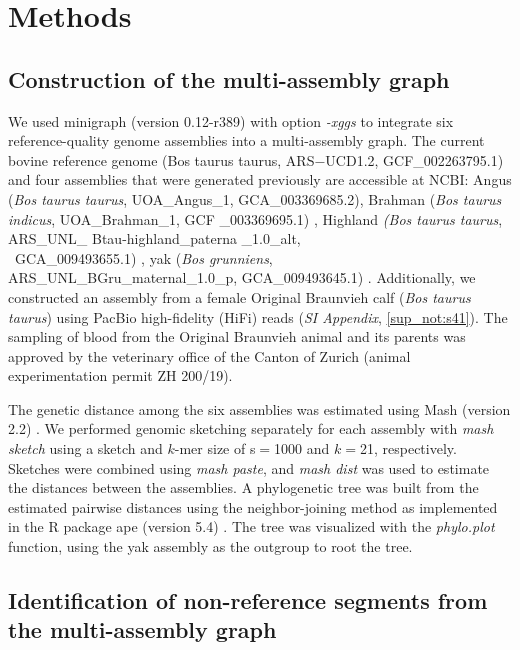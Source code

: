 \documentclass[../main.tex]{subfiles}
\begin{document}
\section{Methods}
\vspace{-1em}
\subsection*{Construction of the multi-assembly graph}

We used minigraph \citep{li2020design} (version 0.12-r389) with option \emph{-xggs} to integrate six reference-quality genome assemblies into a multi-assembly graph. The current bovine reference genome (Bos taurus taurus, ARS$-$UCD1.2, GCF\_002263795.1) and four assemblies that were generated previously are accessible at NCBI: Angus (\emph{Bos taurus taurus}, UOA\_Angus\_1, GCA\_003369685.2)\citep{low2020haplotype}, Brahman (\emph{Bos taurus indicus}, UOA\_Brahman\_1, GCF \_003369695.1) \citep{low2020haplotype}, Highland \emph{(Bos taurus taurus}, ARS\_UNL\_ Btau-highland\_paterna \_1.0\_alt, \\ GCA\_009493655.1) \citep{rice2020continuous}, yak (\emph{Bos grunniens}, \\ ARS\_UNL\_BGru\_maternal\_1.0\_p, GCA\_009493645.1) \citep{rice2020continuous}. Additionally, we constructed an assembly from a female Original Braunvieh calf (\emph{Bos taurus taurus}) using PacBio high-fidelity (HiFi) reads (\emph{SI Appendix}, \ref{sup_not:s41}). The sampling of blood from the Original Braunvieh animal and its parents was approved by the veterinary office of the Canton of Zurich (animal experimentation permit ZH 200/19).

The genetic distance among the six assemblies was estimated using Mash (version 2.2) \citep{ondov2016mash}. We performed genomic sketching separately for each assembly with \emph{mash sketch } using a sketch and $k$-mer size of s$=$1000 and $k$$=$21, respectively. Sketches were combined using \emph{ mash paste}, and \emph{mash dist} was used to estimate the distances between the assemblies. A phylogenetic tree was built from the estimated pairwise distances using the neighbor-joining method \citep{saitou1987neighbor} as implemented in the R package ape (version 5.4) \citep{paradis2019ape}. The tree was visualized with the \emph{phylo.plot} function, using the yak assembly as the outgroup to root the tree.

\subsection*{Identification of non-reference segments from the multi-assembly graph}
\end{document}
